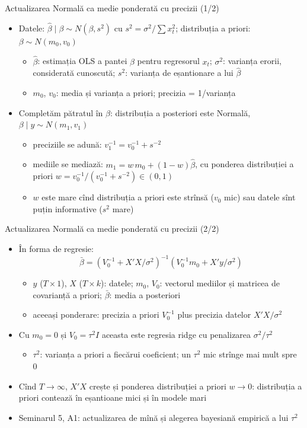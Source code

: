 \begin{frame}{Actualizarea Normală ca medie ponderată cu precizii (1/2)}
\itemsize{\small}
\begin{itemize}
    \item Datele: $\hat\beta\mid\beta \sim N(\beta, s^2)$ cu $s^2 = \sigma^2/\sum x_t^2$; distribuția a priori: $\beta \sim N(m_0, v_0)$
    \begin{itemize}
        \item $\hat\beta$: estimația OLS a pantei $\beta$ pentru regresorul $x_t$; $\sigma^2$: varianța erorii, considerată cunoscută; $s^2$: varianța de eșantionare a lui $\hat\beta$
        \item $m_0$, $v_0$: media și varianța a priori; precizia = 1/varianța
    \end{itemize}
    \item Completăm pătratul în $\beta$: distribuția a posteriori este Normală, $\beta\mid y \sim N(m_1, v_1)$
    \begin{itemize}
        \item preciziile se adună: $v_1^{-1} = v_0^{-1} + s^{-2}$
        \item mediile se mediază: $m_1 = w\,m_0 + (1 - w)\hat\beta$, cu ponderea distribuției a priori $w = v_0^{-1}/(v_0^{-1} + s^{-2}) \in (0, 1)$
        \item $w$ este mare cînd distribuția a priori este strînsă ($v_0$ mic) sau datele sînt puțin informative ($s^2$ mare)
    \end{itemize}
\end{itemize}
\end{frame}

\begin{frame}{Actualizarea Normală ca medie ponderată cu precizii (2/2)}
\itemsize{\small}
\begin{itemize}
    \item În forma de regresie: \[ \bar\beta = (V_0^{-1} + X'X/\sigma^2)^{-1}(V_0^{-1}m_0 + X'y/\sigma^2) \]
    \begin{itemize}
        \item $y$ ($T\times 1$), $X$ ($T\times k$): datele; $m_0$, $V_0$: vectorul mediilor și matricea de covarianță a priori; $\bar\beta$: media a posteriori
        \item aceeași ponderare: precizia a priori $V_0^{-1}$ plus precizia datelor $X'X/\sigma^2$
    \end{itemize}
    \item Cu $m_0 = 0$ și $V_0 = \tau^2I$ aceasta este regresia ridge cu penalizarea $\sigma^2/\tau^2$
    \begin{itemize}
        \item $\tau^2$: varianța a priori a fiecărui coeficient; un $\tau^2$ mic strînge mai mult spre 0
    \end{itemize}
    \item Cînd $T \to \infty$, $X'X$ crește și ponderea distribuției a priori $w \to 0$: distribuția a priori contează în eșantioane mici și în modele mari
    \item Seminarul 5, A1: actualizarea de mînă și alegerea bayesiană empirică a lui $\tau^2$
\end{itemize}
\end{frame}


